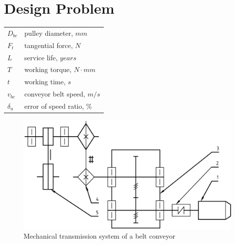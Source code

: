 \documentclass{presets}
\begin{document}
	\section*{Design Problem}
		\begin{tabular}[ht]{ll}
			$ D_{bc} $ & pulley diameter, $ \unit{mm} $\\
			$ F_t $ & tangential force, $ \unit{N} $\\			
			$ L $ & service life, $ \unit{years} $\\
			$ T $ & working torque, $ \unit{N \cdot mm} $\\
			$ t $ & working time, $ \unit{s} $\\
			$ v_{bc} $ & conveyor belt speed, $ \unit{m/s} $\\
			$ \delta_u $ & error of speed ratio, $ \unit{\%} $
		\end{tabular}
	\begin{figure}[ht]
		\centering
		\includegraphics[width=150mm]{system.png}
		\caption{Mechanical transmission system of a belt conveyor}
		\label{system diagram}
	\end{figure}
\end{document}
